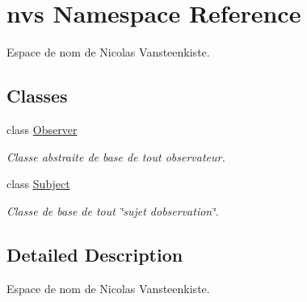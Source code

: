\hypertarget{namespacenvs}{}\section{nvs Namespace Reference}
\label{namespacenvs}


Espace de nom de Nicolas Vansteenkiste.  


\subsection*{Classes}
\begin{DoxyCompactItemize}
\item 
class \mbox{\hyperlink{classnvs_1_1_observer}{Observer}}
\begin{DoxyCompactList}\small\item\em Classe abstraite de base de tout observateur. \end{DoxyCompactList}\item 
class \mbox{\hyperlink{classnvs_1_1_subject}{Subject}}
\begin{DoxyCompactList}\small\item\em Classe de base de tout \char`\"{}sujet d\textquotesingle{}observation\char`\"{}. \end{DoxyCompactList}\end{DoxyCompactItemize}


\subsection{Detailed Description}
Espace de nom de Nicolas Vansteenkiste. 